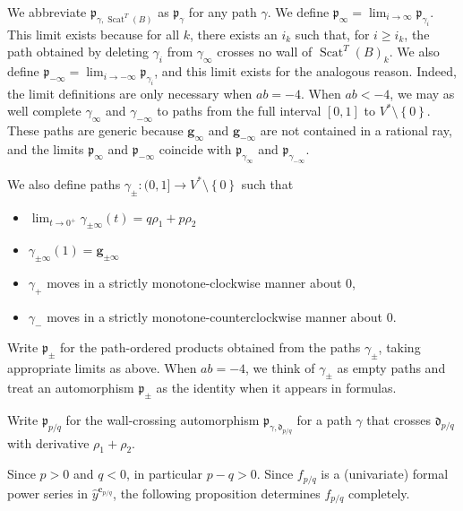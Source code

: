 \documentclass[10pt,a4paper]{amsart}
\theoremstyle{definition}
\DeclareMathOperator{\Scat}{Scat}
\newcommand{\set}[1]{{\left\lbrace #1 \right\rbrace}}
\newcommand{\p}{{\mathfrak p}}
\newcommand{\g}{\mathbf{g}}
\newcommand{\cc}{\mathbf{c}}
\renewcommand{\d}{{\mathfrak d}}
\newcommand{\hy}{\hat{y}}
\begin{document}
We abbreviate $\p_{\gamma,\Scat^T(B)}$ as $\p_\gamma$ for any path $\gamma$.
We define $\p_\infty=\lim_{i\to\infty}\p_{\gamma_i}$.
This limit exists because for all $k$, there exists an $i_k$ such that, for $i\ge i_k$, the path obtained by deleting $\gamma_i$ from $\gamma_\infty$ crosses no wall of $\Scat^T(B)_k$.
We also define $\p_{-\infty}=\lim_{i\to-\infty}\p_{\gamma_i}$, and this limit exists for the analogous reason.
Indeed, the limit definitions are only necessary when $ab=-4$. 
When $ab<-4$, we may as well complete $\gamma_\infty$ and $\gamma_{-\infty}$ to paths from the full interval $[0,1]$ to $V^*\setminus\set{0}$. 
These paths are generic because $\g_\infty$ and $\g_{-\infty}$ are not contained in a rational ray, and the limits $\p_\infty$ and $\p_{-\infty}$ coincide with $\p_{\gamma_\infty}$ and $\p_{\gamma_{-\infty}}$.

We also define paths $\gamma_\pm:(0,1]\to V^*\setminus\set{0}$ such that
\begin{itemize} 
\item $\lim_{t\to0^+}\gamma_{\pm\infty}(t)=q\rho_1+p\rho_2$
\item $\gamma_{\pm\infty}(1)=\g_{\pm\infty}$
\item $\gamma_+$ moves in a strictly monotone-clockwise manner about $0$,
\item $\gamma_-$ moves in a strictly monotone-counterclockwise manner about $0$.
\end{itemize}
Write $\p_\pm$ for the path-ordered products obtained from the paths $\gamma_\pm$, taking appropriate limits as above.
When $ab=-4$, we think of $\gamma_\pm$ as empty paths and treat an automorphism $\p_\pm$ as the identity when it appears in formulas.

Write $\p_{p/q}$ for the wall-crossing automorphism $\p_{\gamma,\d_{p/q}}$ for a path $\gamma$ that crosses $\d_{p/q}$ with derivative $\rho_1+\rho_2$.

Since $p>0$ and $q<0$, in particular $p-q>0$.
Since $f_{p/q}$ is a (univariate) formal power series in $\hy^{\cc_{p/q}}$, the following proposition determines $f_{p/q}$ completely.
\end{document}
